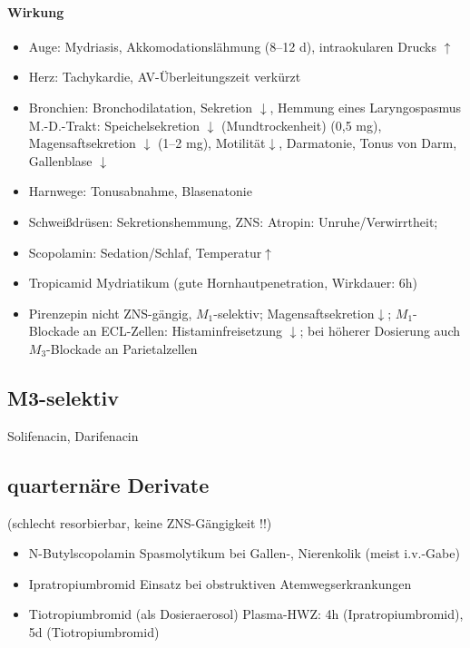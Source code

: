 \documentclass[10pt,a4paper]{report}
\begin{document}
\paragraph{Wirkung}
\begin{itemize}
	\item Auge:	Mydriasis, Akkomodationslähmung (8–12 d), intraokularen Drucks $\uparrow$
	\item Herz:	Tachykardie, AV-Überleitungszeit verkürzt
	\item Bronchien: 	Bronchodilatation, Sekretion $\downarrow$, Hemmung eines Laryngospasmus
M.-D.-Trakt: Speichelsekretion $\downarrow$ (Mundtrockenheit) (0,5 mg), Magensaftsekretion $\downarrow$ (1–2 mg), Motilität$\downarrow$, Darmatonie, Tonus von Darm, Gallenblase $\downarrow$
	\item Harnwege: 	Tonusabnahme, Blasenatonie 
	\item Schweißdrüsen: Sekretionshemmung, ZNS:    Atropin: Unruhe/Verwirrtheit;  			\item Scopolamin: Sedation/Schlaf, Temperatur$\uparrow$
\end{itemize}
\begin{itemize}
	\item Tropicamid Mydriatikum (gute Hornhautpenetration, Wirkdauer: 6h)
	\item Pirenzepin nicht ZNS-gängig, $M_1$-selektiv; Magensaftsekretion$\downarrow$; $M_1$-Blockade an ECL-Zellen: Histaminfreisetzung $\downarrow$; bei höherer Dosierung auch $M_3$-Blockade an Parietalzellen
\end{itemize}
\subsection{M3-selektiv} Solifenacin, Darifenacin
\subsection{quarternäre Derivate}(schlecht resorbierbar, keine ZNS-Gängigkeit !!)
\begin{itemize}
	\item N-Butylscopolamin	Spasmolytikum bei Gallen-, Nierenkolik (meist i.v.-Gabe)
	\item Ipratropiumbromid	Einsatz bei obstruktiven Atemwegserkrankungen
	\item Tiotropiumbromid	(als Dosieraerosol) Plasma-HWZ: 4h (Ipratropiumbromid), 5d (Tiotropiumbromid)
\end{itemize}
\end{document}
